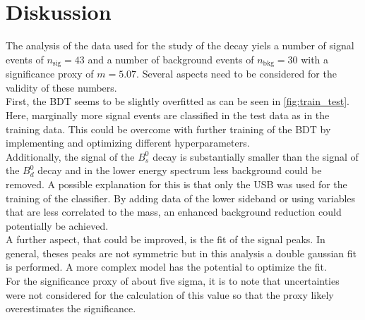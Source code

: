 \section{Diskussion}
\label{sec:Diskussion}
The analysis of the data used for the study of the decay \printBstoPsiKs \: yiels a number of signal events of $n_\text{sig} = \num{43}$ and a number of background events of $n_\text{bkg} = \num{30}$
with a significance proxy of $m = \num{5.07}$. Several aspects need to be considered for the validity of these numbers. \\
First, the BDT seems to be slightly overfitted as can be seen in \autoref{fig:train_test}. Here, marginally more signal events are classified in the test data as in the training data.
This could be overcome with further training of the BDT by implementing and optimizing different hyperparameters. \\
Additionally, the signal of the $B^0_s$ decay is substantially smaller than the signal of the $B^0_d$ decay and in the lower energy spectrum less background could be removed. A possible explanation
for this is that only the USB was used for the training of the classifier. By adding data of the lower sideband or using variables that are less correlated to the mass, an enhanced background reduction
could potentially be achieved. \\
A further aspect, that could be improved, is the fit of the signal peaks. In general, theses peaks are not symmetric but in this analysis a double gaussian fit is performed. A more complex model has 
the potential to optimize the fit. \\
For the significance proxy of about five sigma, it is to note that uncertainties were not considered for the calculation of this value so that the proxy likely overestimates the significance.

%
%
